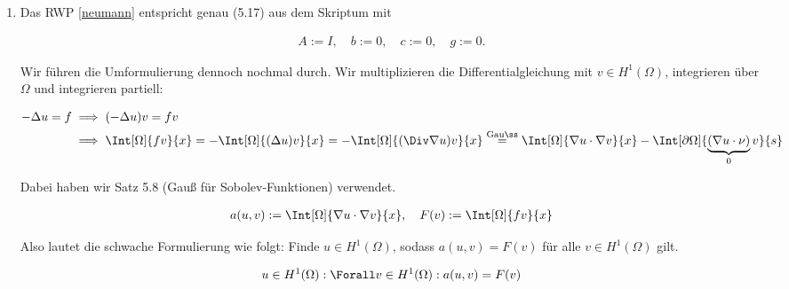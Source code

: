 \begin{solution}

\phantom{}


\begin{enumerate}[label = \alph*)]

    \item Das RWP \eqref{neumann} entspricht genau (5.17) aus dem Skriptum mit
    
    \begin{align*}
        A := I, \quad b := 0, \quad c := 0, \quad g := 0.
    \end{align*}


    Wir führen die Umformulierung dennoch nochmal durch.
    Wir multiplizieren die Differentialgleichung mit $v \in H^1(\Omega)$, integrieren über $\Omega$ und integrieren partiell:

    \begin{align*}
        -\Delta u = f
        & \implies
        (-\Delta u) v = f v \\
        & \implies 
        \Int[\Omega]{f v}{x}
        =
        -\Int[\Omega]{(\Delta u) v}{x}
        =
        -\Int[\Omega]{(\Div \nabla u) v}{x}
        \stackrel
        {
            \mathrm{Gauß}
        }{=}
        \Int[\Omega]{\nabla u \cdot \nabla v}{x}
        -
        \Int[\partial \Omega]{\underbrace{(\nabla u \cdot \nu)}_0 v}{s}
    \end{align*}

    Dabei haben wir Satz 5.8 (Gauß für Sobolev-Funktionen) verwendet.


    \begin{align*}
        a(u, v) := \Int[\Omega]{\nabla u \cdot \nabla v}{x},
        \quad
        F(v) := \Int[\Omega]{f v}{x}
    \end{align*}

    Also lautet die schwache Formulierung wie folgt:
    Finde $u \in H^1(\Omega)$, sodass $a(u, v) = F(v)$ für alle $v \in H^1(\Omega)$ gilt.

    \begin{align*}
        u \in H^1(\Omega):
        \Forall v \in H^1(\Omega):
        a(u, v) = F(v)
    \end{align*}


\end{enumerate}
\end{solution}
